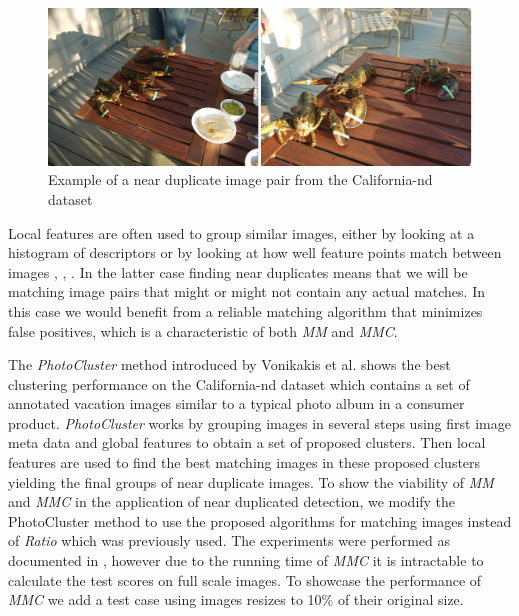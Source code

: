 \begin{figure}[h]
	\includegraphics[width=\textwidth]{images/near_duplicate_example}
	\caption{Example of a near duplicate image pair from the 
	California-nd dataset \cite{jinda2012california}}
	\label{fig:near_duplicate}
\end{figure}

Local features are often used to group similar images, either by looking
at a histogram of descriptors \cite{wu2009bundling} or by looking at how
well feature points match between images \cite{zhao2009scale},
\cite{chu2010consumer}, \cite{vas2013cluster}. In the latter case 
finding near duplicates means that we will be matching image pairs that 
might or might not contain any actual matches. In this case we would 
benefit from a reliable matching algorithm that minimizes false 
positives, which is a characteristic of both \emph{MM} and \emph{MMC}.

The \emph{PhotoCluster} method introduced by Vonikakis et al.  
\cite{vas2013cluster} shows the best clustering performance on the 
California-nd dataset \cite{jinda2012california} which contains a set of
annotated vacation images similar to a typical photo album in a consumer
product. \emph{PhotoCluster} works by grouping images in several steps 
using first image meta data and global features to obtain a set of 
proposed clusters. Then local features are used to find the best 
matching images in these proposed clusters yielding the final groups of 
near duplicate images. To show the viability of \emph{MM} and \emph{MMC} 
in the application of near duplicated detection, we modify the 
PhotoCluster method to use the proposed algorithms for matching images 
instead of \emph{Ratio} which was previously used. The experiments were 
performed as documented in \cite{vas2013cluster}, however due to the 
running time of \emph{MMC} it is intractable to calculate the test 
scores on full scale images. To showcase the performance of \emph{MMC} 
we add a test case using images resizes to 10\% of their original size.

